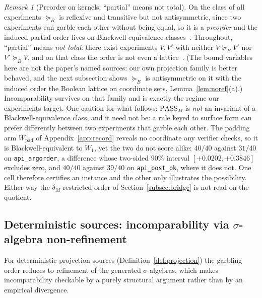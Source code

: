 \documentclass[11pt]{article}
\theoremstyle{plain}
\theoremstyle{definition}
\theoremstyle{remark}
\newtheorem{remark}{Remark}
\newcommand{\PASS}{\mathrm{PASS}}
\newcommand{\Bord}{\succeq_{B}}
\begin{document}
\begin{remark}[Preorder on kernels; ``partial'' means not total]
\label{rem:partial}
On the class of all experiments $\Bord$ is reflexive and transitive but not antisymmetric, since
two experiments can garble each other without being equal, so it is a \emph{preorder} and the
induced partial order lives on Blackwell-equivalence classes~\citep{blackwell1953}. Throughout,
``partial'' means \emph{not total}: there exist experiments $V, V'$ with neither $V \Bord V'$ nor
$V' \Bord V$, and on that class the order is not even a
lattice~\citep{bertschinger2014nolattice,torgersen1991}. (The bound variables here are not the
paper's named sources: our own projection family is better behaved, and the next subsection shows
$\Bord$ is antisymmetric on it with the induced order the Boolean lattice on coordinate sets,
Lemma~\ref{lem:noref}(a).) Incomparability survives on that family and is exactly the regime our
experiments target. One caution for what follows: $\PASS_M$ is \emph{not} an invariant of a
Blackwell-equivalence class, and it need not be: a rule keyed to surface form can prefer
differently between two experiments that garble each other. The padding arm
$W_{\mathrm{pad}}$ of Appendix~\ref{app:record} reveals no coordinate any verifier checks, so it
is Blackwell-equivalent to $W_1$, yet the two do not score alike: $40/40$ against $31/40$ on
\texttt{api\_argorder}, a difference whose two-sided $90\%$ interval $[+0.0202,+0.3846]$ excludes
zero, and $40/40$ against $39/40$ on \texttt{api\_post\_ok}, where it does not. One cell therefore
certifies an instance and the other only illustrates the possibility. Either way the
$\delta_M$-restricted order of Section~\ref{subsec:bridge} is not read on the quotient.
\end{remark}

\subsection{Deterministic sources: incomparability via \texorpdfstring{$\sigma$}{sigma}-algebra non-refinement}

For deterministic projection sources (Definition~\ref{def:projection}) the garbling order reduces
to refinement of the generated $\sigma$-algebras, which makes incomparability checkable by a
purely structural argument rather than by an empirical divergence.
\end{document}
